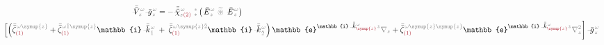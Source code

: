 \begin{subequations}
\begin{align}
	\xint{\mathcolor{gray}{-}}{25}{\bar{\bar{V}}}^{\;\! \mathcolor{gray}{\omega}}_{\;\! \mathcolor{gray}{z}} \xint{{}^{}_{\mathcolor{gray}{-}}}{10}{\bar{g}}^{\;\!\mathcolor{gray}{\omega}}_{\;\! \mathcolor{gray}{z}}
	&= - \xint{{}^{}_{\mathcolor{gray}{-}}}{23}{\bar{\bar{\bar{\chi}}}}^{\;\! \mathcolor{gray}{\omega}}_{\mathcolor{gray}{z} \textcolor{Maroon}{(2)}} ~{}^{\mathcolor{gray}{*}}_{\mathcolor{gray}{*}} \left( \xint{\mathcolor{gray}{-}}{295}{\bar{E}}^{\;\!\mathcolor{gray}{\omega}}_{\;\! \mathcolor{gray}{z}} ~\mathcolor{gray}{\widetilde \circledast}~ \xint{\mathcolor{gray}{-}}{295}{\bar{E}}^{\;\!\mathcolor{gray}{\omega}}_{\;\! \mathcolor{gray}{z}} \right)  \label{eq:nonlinear(2)-wave_wkrho-simplify6-V} \\
	\left[ \left( \bar{\bar{\zeta}}^{\;\! \mathcolor{gray}{\omega} \mathcolor{gray}{\symup{z}}}_{\textcolor{Maroon}{(1)}} + \bar{\bar{\zeta}}^{\;\! \mathcolor{gray}{\omega} \mathcolor{gray}{\check{1} \symup{z}}}_{\textcolor{Maroon}{(1)}} \mathbb{i} \xint{\begin{smallmatrix} ~ \\ {}^{}_{\mathcolor{gray}{-}} \\ ~ \end{smallmatrix}}{15}{\bar{\bar{k}}}_{\;\! \mathcolor{gray}{\check{1}}}^{\;\! \mathcolor{gray}{\omega}} \right.\right.&+\left.\left. \bar{\bar{\zeta}}^{\;\! \mathcolor{gray}{\omega} \mathcolor{gray}{\symup{z} \check{2}}}_{\textcolor{Maroon}{(1)}} \mathbb{i} \xint{\begin{smallmatrix} ~ \\ {}^{}_{\mathcolor{gray}{-}} \\ ~ \end{smallmatrix}}{15}{\bar{\bar{k}}}_{\;\! \mathcolor{gray}{\check{2}}}^{\;\! \mathcolor{gray}{\omega}} \right) \mathbb{e}^{\mathbb{i} \xint{\begin{smallmatrix} ~ \\ {}^{}_{\mathcolor{gray}{-}} \\ ~ \end{smallmatrix}}{15}{\bar{\bar{k}}}_{\textcolor{Maroon}{\symup{z}}}^{\;\! \mathcolor{gray}{\omega}} \mathcolor{gray}{z}} \mathcolor{gray}{\nabla_z} + \bar{\bar{\zeta}}^{\;\! \mathcolor{gray}{\omega} \mathcolor{gray}{\symup{z} \symup{z}}}_{\textcolor{Maroon}{(1)}} \mathbb{e}^{\mathbb{i} \xint{\begin{smallmatrix} ~ \\ {}^{}_{\mathcolor{gray}{-}} \\ ~ \end{smallmatrix}}{15}{\bar{\bar{k}}}_{\textcolor{Maroon}{\symup{z}}}^{\;\! \mathcolor{gray}{\omega}} \mathcolor{gray}{z}} \mathcolor{gray}{\nabla_z^2} \right] \xint{{}^{}_{\mathcolor{gray}{-}}}{10}{\bar{g}}^{\;\!\mathcolor{gray}{\omega}}_{\;\! \mathcolor{gray}{z}} \label{eq:nonlinear(2)-wave_wkrho-simplify6-V2} \\

\end{align}
\end{subequations}
